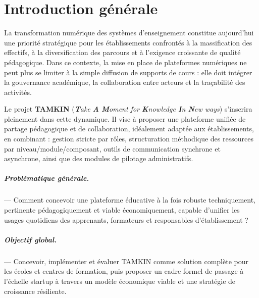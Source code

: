 \documentclass[12pt,a4paper,oneside]{report}
\begin{document}
\setcounter{page}{1}


\chapter*{Introduction g\'en\'erale}

La transformation num\'erique des syst\`emes d’enseignement constitue aujourd’hui une priorit\'e strat\'egique pour les \'etablissements confront\'es \`a la massification des effectifs, \`a la diversification des parcours et \`a l’exigence croissante de qualit\'e p\'edagogique. Dans ce contexte, la mise en place de plateformes num\'eriques ne peut plus se limiter \`a la simple diffusion de supports de cours : elle doit int\'egrer la gouvernance acad\'emique, la collaboration entre acteurs et la tra\c{c}abilit\'e des activit\'es.

Le projet \textbf{TAMKIN} (\textit{\textbf{T}ake \textbf{A} \textbf{M}oment for \textbf{K}nowledge \textbf{I}n \textbf{N}ew ways}) s’inscrira pleinement dans cette dynamique. Il vise \`a proposer une plateforme unifi\'ee de partage p\'edagogique et de collaboration, id\'ealement adapt\'ee aux \'etablissements, en combinant : gestion stricte par r\^oles, structuration m\'ethodique des ressources par niveau/module/composant, outils de communication synchrone et asynchrone, ainsi que des modules de pilotage administratifs.

\paragraph{Probl\'ematique g\'en\'erale.} --- Comment concevoir une plateforme \'educative \`a la fois robuste techniquement, pertinente p\'edagogiquement et viable \'economiquement, capable d’unifier les usages quotidiens des apprenants, formateurs et responsables d’\'etablissement ?

\paragraph{Objectif global.} --- Concevoir, impl\'ementer et \'evaluer TAMKIN comme solution compl\`ete pour les \'ecoles et centres de formation, puis proposer un cadre formel de passage \`a l’\'echelle startup \`a travers un mod\`ele \'economique viable et une strat\'egie de croissance r\'esiliente.
\end{document}
